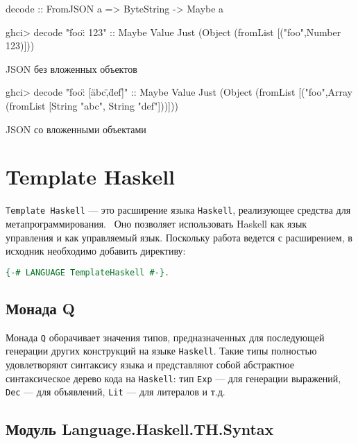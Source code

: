\begin{ListingEnv}[H]
\begin{Verb}
decode :: FromJSON a => ByteString -> Maybe a

ghci> decode "{\"foo\": 123}" :: Maybe Value
Just (Object (fromList [("foo",Number 123)]))
\end{Verb}
\caption{JSON без вложенных объектов}
\label{listing:astGetSimple}
\end{ListingEnv}

\begin{ListingEnv}[H]
\begin{Verb}
ghci> decode "{\"foo\": [\"abc\",\"def\"]}" :: Maybe Value
Just (Object (fromList [("foo",Array (fromList [String "abc", 
                                               String "def"]))]))
\end{Verb}
\caption{JSON со вложенными объектами}
\label{listing:astGetComp}
\end{ListingEnv}

\section{Template Haskell}

\lstinline{Template Haskell} --- это расширение языка \lstinline{Haskell}, реализующее средства для метапрограммирования.~\cite{extensionHub} Оно позволяет использовать Haskell как язык управления и как управляемый язык. Поскольку работа ведется с расширением, в исходник необходимо добавить директиву:

\begin{lstlisting}[language=Haskell]
{-# LANGUAGE TemplateHaskell #-}.
\end{lstlisting}

\subsection{Монада Q}

Монада \lstinline{Q} оборачивает значения типов, предназначенных для последующей генерации других конструкций на языке \lstinline{Haskell}. Такие типы полностью удовлетворяют синтаксису языка и представляют собой абстрактное синтаксическое дерево кода на \lstinline{Haskell}: тип \lstinline{Exp} --- для генерации выражений, \lstinline{Dec} --- для объявлений, \lstinline{Lit} --- для литералов и т.д.~\cite{thSyntax}

\subsection{Модуль Language.Haskell.TH.Syntax}

